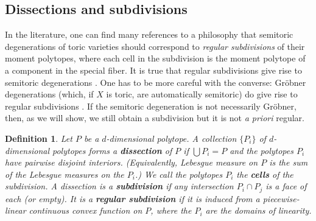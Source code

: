 \documentclass[10pt,a4paper]{amsart}
\newtheorem{definition}[Thm]{Definition}
\newcommand{\MSB}[1]{\textcolor{violet}{[MSB: #1]}}
\newcommand{\AK}[1]{\textcolor{darkgreen}{[AK: #1]}}
\newcommand{\CC}{\mathbb{C}}
\newcommand{\PP}{\mathbb{P}}
\newcommand\defn[1]{{\bf #1}}
\newcommand\junk[1]{}
\begin{document}
\subsection{Dissections and subdivisions}

In the literature, one can find many references to a philosophy that
semitoric degenerations of toric varieties should
correspond to {\em regular subdivisions} of their moment polytopes, where each cell in the subdivision is the moment polytope of a component in the special fiber.
It is true that regular subdivisions give rise to semitoric degenerations
\cite{sturmfels1991grobner}. One has to be more careful
with the converse: Gr\"obner degenerations (which, if $X$ is toric,
are automatically semitoric) do give rise to regular subdivisions \cite{sturmfels1991grobner}. If the semitoric degeneration is not necessarily Gr\"obner, then, as we will show, we still obtain a subdivision but it is not \emph{a priori} regular.
\junk{
\AK{Should we attempt to demonstrate a degeneration to a nonregular
  subdivision? There's $\PP^2$ inside $\PP(Sym^4\CC^3)$ to a union of $7$
  triangles. (I'm fine with creating new vertices.) Is there a simpler
  example? The pieces don't need to be triangles.} \MSB{I think that would be nice, if it's not too terrible. The 7-triangles example is the smallest/simplest nonregular subdivision I know of.}
}

\begin{definition}
  Let $P$ be a $d$-dimensional polytope. A collection $\{P_i\}$ of
  $d$-dimensional polytopes forms a \defn{dissection} of $P$ if
  $\bigcup P_i = P$ and the polytopes $P_i$ have pairwise disjoint
  interiors. (Equivalently, Lebesgue measure on $P$ is the sum of
  the Lebesgue measures on the $P_i$.) We call the polytopes $P_i$ the \defn{cells} of the subdivision. A dissection is a \defn{subdivision} 
  if any intersection $P_i \cap P_j$ is a face of each (or empty).
  It is a \defn{regular subdivision} if it is induced from a
  piecewise-linear continuous convex function on $P$,
  where the $P_i$ are the domains of linearity.
\end{definition}
\end{document}
